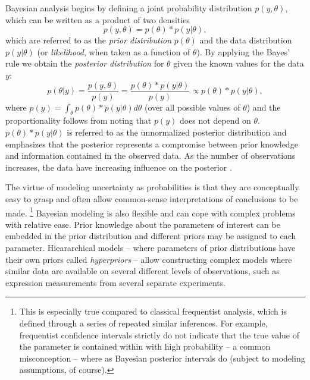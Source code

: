 Bayesian analysis begins by defining a joint probability distribution
$p(y,\theta)$, which can be written as a product of two densities
\begin{equation}
  p(y,\theta) = p(\theta)*p(y|\theta),
\end{equation}
which are referred to as the \emph{prior distribution} $p(\theta)$ and the
data distribution $p(y|\theta)$ (or \emph{likelihood}, when taken as a
function of $\theta$). By applying the Bayes' rule we obtain the
\emph{posterior distribution} for $\theta$ given the known values for the
data $y$:
\begin{equation}
  \label{eq:bayes}
  p(\theta|y) = \frac{p(y,\theta)}{p(y)} = \frac{p(\theta)*p(y|\theta)}{p(y)} \propto p(\theta)*p(y|\theta),
\end{equation}
where $p(y) = \int_{\theta} p(\theta)*p(y|\theta) d\theta$ (over
all possible values of $\theta$) and the proportionality follows from
noting that $p(y)$ does not depend on $\theta$. $p(\theta)*p(y|\theta)$
is referred to as the unnormalized posterior distribution and emphasizes that
the posterior represents a compromise between prior knowledge and information contained in
the observed data. As the number of observations increases, the data have
increasing influence on the posterior \citep{Gelman2013}.

The virtue of modeling uncertainty as probabilities is that they are
conceptually easy to grasp and often allow common-sense interpretations of conclusions
to be made.
\footnote{This is especially true compared to classical frequentist analysis,
which is defined through a series of repeated similar inferences. For
example, frequentist confidence intervals strictly do not indicate that the
true value of the parameter is contained within with high probability -- a
common misconception -- where as Bayesian posterior intervals do (subject to
modeling assumptions, of course).}
Bayesian modeling is also flexible and can cope with complex problems with
relative ease. Prior knowledge about the parameters of interest can be
embedded in the prior distribution and different priors may be assigned to
each parameter. Hieararchical models -- where parameters of prior
distributions have their own priors called \emph{hyperpriors} -- allow
constructing complex models where similar data are available on several
different levels of observations, such as expression measurements from
several separate experiments.


